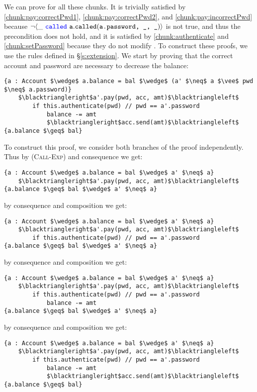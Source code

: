 \documentclass[11pt]{article} %
\theoremstyle{definition}
\begin{document}
We can prove  for all these chunks. It is trivially satisfied by \ref{chunk:pay:correctPwd1}, \ref{chunk:pay:correctPwd2}, 
and \ref{chunk:pay:incorrectPwd} because $\neg\langle \_\ {\color{blue}\texttt{called}}\ {\texttt{a}}.{\texttt{called}}({\texttt{a.password, \_, \_}}) \rangle$ is not true, and thus 
the precondition does not hold, and it is satisfied by \ref{chunk:authenticate} and \ref{chunk:setPassword} because they do not modify 
. To construct these proofs, we use the rules defined in \S \ref{s:extension}. We start by proving that the correct account
and password are necessary to decrease the balance:
\begin{lstlisting}[language = Chainmail, frame  = lines, mathescape = true]
{a : Account $\wedge$ a.balance = bal $\wedge$ (a' $\neq$ a $\vee$ pwd $\neq$ a.password)}
	$\blacktriangleright$a'.pay(pwd, acc, amt)$\blacktriangleleft$
		if this.authenticate(pwd) // pwd == a'.password
			balance -= amt
			$\blacktriangleright$acc.send(amt)$\blacktriangleleft$
{a.balance $\geq$ bal}
\end{lstlisting}
To construct this proof, we consider both branches of the proof independently. Thus
by (\textsc{Call-Exp}) and consequence we get:
\begin{lstlisting}[language = Chainmail, frame  = lines, mathescape = true]
{a : Account $\wedge$ a.balance = bal $\wedge$ a' $\neq$ a}
	$\blacktriangleright$a'.pay(pwd, acc, amt)$\blacktriangleleft$
{a.balance $\geq$ bal $\wedge$ a' $\neq$ a}
\end{lstlisting}
by consequence and composition we get:
\begin{lstlisting}[language = Chainmail, frame  = lines, mathescape = true]
{a : Account $\wedge$ a.balance = bal $\wedge$ a' $\neq$ a}
	$\blacktriangleright$a'.pay(pwd, acc, amt)$\blacktriangleleft$
		if this.authenticate(pwd) // pwd == a'.password
{a.balance $\geq$ bal $\wedge$ a' $\neq$ a}
\end{lstlisting}
by consequence and composition we get:
\begin{lstlisting}[language = Chainmail, frame  = lines, mathescape = true]
{a : Account $\wedge$ a.balance = bal $\wedge$ a' $\neq$ a}
	$\blacktriangleright$a'.pay(pwd, acc, amt)$\blacktriangleleft$
		if this.authenticate(pwd) // pwd == a'.password
			balance -= amt
{a.balance $\geq$ bal $\wedge$ a' $\neq$ a}
\end{lstlisting}
by consequence and composition we get:
\begin{lstlisting}[language = Chainmail, frame  = lines, mathescape = true]
{a : Account $\wedge$ a.balance = bal $\wedge$ a' $\neq$ a}
	$\blacktriangleright$a'.pay(pwd, acc, amt)$\blacktriangleleft$
		if this.authenticate(pwd) // pwd == a'.password
			balance -= amt
			$\blacktriangleright$acc.send(amt)$\blacktriangleleft$
{a.balance $\geq$ bal}
\end{lstlisting}
\end{document}
